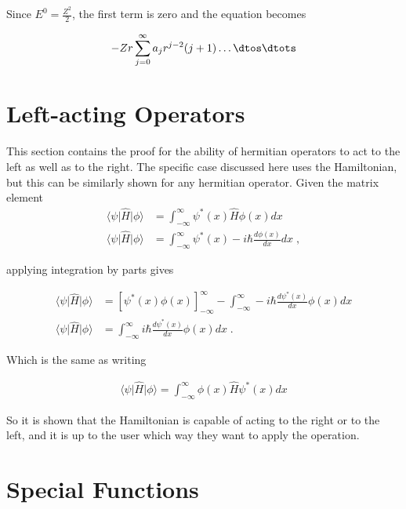    \noindent Since $E^0 = \frac{Z^2}{2}$, the first term is zero and the equation becomes 

    \begin{align}
        -Zr \sum_{j = 0}^\infty a_j r^{j - 2} (j + 1)  \dots \dtos \dtots
    \end{align}



\chapter{Left-acting Operators} \label{sec:Hermitian_Left}
    This section contains the proof for the ability of hermitian operators to act to the left as well as to the right. The specific case discussed here uses the Hamiltonian, but this can be similarly shown for any hermitian operator. Given the matrix element
    \begin{align}
        \langle \psi \vert \hat{H} \vert \phi \rangle &= \int^\infty_{-\infty} \psi^*(x) \hat{H} \phi(x) dx\\
        \langle \psi \vert \hat{H} \vert \phi \rangle &= \int^\infty_{-\infty} \psi^*(x) -i\hbar\frac{d \phi(x)}{dx} dx\;,
    \end{align}

    \noindent applying integration by parts gives 

    \begin{align}
        \langle \psi \vert \hat{H} \vert \phi \rangle &= \left[\psi^*(x) \phi(x) \right]^\infty_{-\infty} - \int_{-\infty}^\infty -i\hbar \frac{d\psi^*(x)}{dx} \phi(x) dx\\
        \langle \psi \vert \hat{H} \vert \phi \rangle &= \int_{-\infty}^\infty i\hbar \frac{d\psi^*(x)}{dx} \phi(x) dx\;.
    \end{align}

    \noindent Which is the same as writing

    \begin{align}
        \langle \psi \vert \hat{H} \vert \phi \rangle = \int^\infty_{-\infty} \phi(x) \hat{H} \psi^*(x) dx
    \end{align}

    \noindent So it is shown that the Hamiltonian is capable of acting to the right or to the left, and it is up to the user which way they want to apply the operation.
\chapter{Special Functions}

